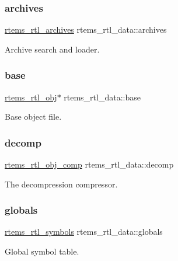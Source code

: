 \subsubsection{\texorpdfstring{archives}{archives}}
{\footnotesize\ttfamily \mbox{\hyperlink{structrtems__rtl__archives}{rtems\+\_\+rtl\+\_\+archives}} rtems\+\_\+rtl\+\_\+data\+::archives}

Archive search and loader. \mbox{\label{structrtems__rtl__data_af955eef3c81a18c5da2a4f4ba9058317}} 
\subsubsection{\texorpdfstring{base}{base}}
{\footnotesize\ttfamily \mbox{\hyperlink{structrtems__rtl__obj}{rtems\+\_\+rtl\+\_\+obj}}$\ast$ rtems\+\_\+rtl\+\_\+data\+::base}

Base object file. \mbox{\label{structrtems__rtl__data_a7f1df4654d7be639be51d0db7d2cc3af}} 
\subsubsection{\texorpdfstring{decomp}{decomp}}
{\footnotesize\ttfamily \mbox{\hyperlink{rtl-obj-comp_8h_a5ac76d7cdc14a520157bd5c8a322f56c}{rtems\+\_\+rtl\+\_\+obj\+\_\+comp}} rtems\+\_\+rtl\+\_\+data\+::decomp}

The decompression compressor. \mbox{\label{structrtems__rtl__data_a5deddd96d70a31534ba44b1a10b3242d}} 
\subsubsection{\texorpdfstring{globals}{globals}}
{\footnotesize\ttfamily \mbox{\hyperlink{structrtems__rtl__symbols}{rtems\+\_\+rtl\+\_\+symbols}} rtems\+\_\+rtl\+\_\+data\+::globals}

Global symbol table. \mbox{\label{structrtems__rtl__data_ad1f26d947fd873cf89f697295db58e19}} 

